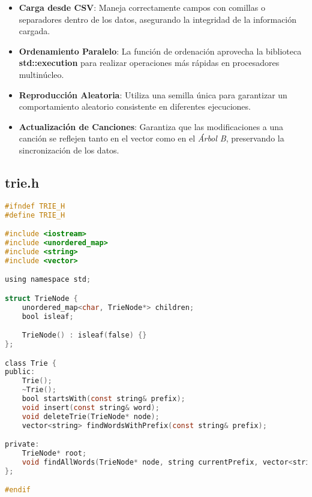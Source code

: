 \documentclass[corference]{IEEEtran}
\begin{document}
\begin{flushleft}
\begin{itemize}[left=4em]
                    \item \textbf{Carga desde CSV}: Maneja correctamente campos con comillas o separadores dentro de los datos, asegurando la integridad de la información cargada.
                    
                    \item \textbf{Ordenamiento Paralelo}: La función de ordenación aprovecha la biblioteca \textbf{std::execution} para realizar operaciones más rápidas en procesadores multinúcleo.
                    
                    \item \textbf{Reproducción Aleatoria}: Utiliza una semilla única para garantizar un comportamiento aleatorio consistente en diferentes ejecuciones.
                    
                    \item \textbf{Actualización de Canciones}: Garantiza que las modificaciones a una canción se reflejen tanto en el vector como en el \textit{Árbol B}, preservando la sincronización de los datos.
                \end{itemize}

            \subsection{trie.h}
                \begin{lstlisting}[language=C, style=mystyle, caption={Cabecera de la Clase Trie}]
#ifndef TRIE_H
#define TRIE_H

#include <iostream>
#include <unordered_map>
#include <string>
#include <vector>

using namespace std;

struct TrieNode {
    unordered_map<char, TrieNode*> children;
    bool isleaf; 

    TrieNode() : isleaf(false) {}
};

class Trie {
public:
    Trie();
    ~Trie();                    
    bool startsWith(const string& prefix); 
    void insert(const string& word);
    void deleteTrie(TrieNode* node);
    vector<string> findWordsWithPrefix(const string& prefix);

private:
    TrieNode* root;
    void findAllWords(TrieNode* node, string currentPrefix, vector<string>& words);
};

#endif
                \end{lstlisting}


\end{flushleft}
\end{document}
